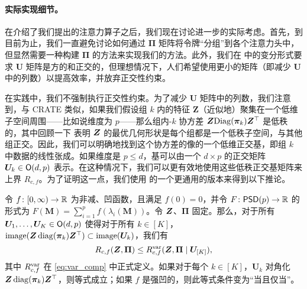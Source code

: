 \documentclass[../../book-main.tex]{subfiles}
\begin{document}
\paragraph{实际实现细节。} 在介绍了我们提出的注意力算子之后，我们现在讨论进一步的实际考虑。首先，到目前为止，我们一直避免讨论如何通过 $\bm\Pi$ 矩阵将令牌“分组”到各个注意力头中，但显然需要一种构建 $\bm\Pi$ 的方法来实现我们的方法。此外，我们在  中的变分形式要求 $\bm U$ 矩阵是方的和正交的，但理想情况下，人们希望使用更小的矩阵（即减少 $\bm U$ 中的列数）以提高效率，并放弃正交性约束。

在实践中，我们不强制执行正交性约束。为了减少 $\bm U$ 矩阵中的列数，我们注意到，与 CRATE \citep{yu2023white} 类似，如果我们假设组 \(k\) 内的特征 $\bm Z$（近似地）聚集在一个低维子空间周围——比如说维度为 \(p\)——那么组内-\(k\) 协方差 \(\bm{Z}\mathrm{Diag}(\bm \pi_{k})\bm{Z}^{\top}\) 是低秩的，其中回顾一下 \cite{yu2020learning} 表明 $\bm{Z}$ 的最优几何形状是每个组都是一个低秩子空间，与其他组正交。因此，我们可以明确地找到这个协方差的像的一个低维正交基，即组 \(k\) 中数据的线性张成。如果维度是 $p \leq d$，基可以由一个 $d\times p$ 的正交矩阵 $\bm U_k \in \mathsf{O}(d, p)$ 表示。在这种情况下，我们可以更有效地使用这些低秩正交基矩阵来上界 \(R_{c,f}\)。为了证明这一点，我们使用  的一个更通用的版本来得到以下推论。
\begin{corollary}\label{cor:var_concave_logdet}
    令 \(f \colon [0, \infty) \to \mathbb{R}\) 为非减、凹函数，且满足 \(f(0) = 0\)，并令 \(F \colon \mathsf{PSD}(p) \to \mathbb{R}\) 的形式为 \(F(\bm M) = \sum_{i = 1}^{p}f(\lambda_{i}(\bm M))\)。令 \(\bm{Z}\)、\(\bm \Pi\) 固定。那么，对于所有 \(\bm U_{1}, \dots, \bm U_{K} \in \mathsf{O}(d, p)\) 使得对于所有 \(k \in [K]\)，\(\mathrm{image}(\bm{Z}\operatorname{diag}(\bm \pi_{k})\bm{Z}^{\top}) \subset \mathrm{image}(\bm U_{k})\)，我们有
    \begin{equation}
        R_{c, f}(\bm{Z}, \bm\Pi) \leq R_{c, f}^{\rm var}(\bm{Z}, \bm\Pi \mid \bm U_{[K]}),
    \end{equation}
     其中 \(R_{c, f}^{\rm var}\) 在 \eqref{eq:var_comp} 中正式定义。如果对于每个 \(k \in [K]\)，\(\bm U_{k}\) 对角化 \(\bm{Z}\operatorname{diag}(\bm \pi_{k})\bm{Z}^{\top}\)，则等式成立；如果 \(f\) 是强凹的，则此等式条件变为“当且仅当”。
\end{corollary}
\end{document}
